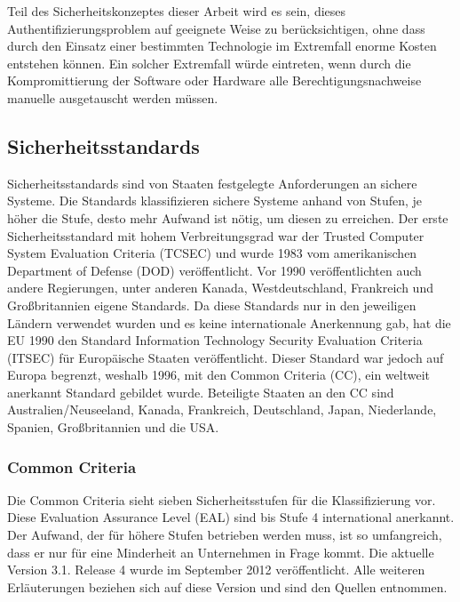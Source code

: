 \documentclass[11pt,a4paper]{report}
\begin{document}
Teil des Sicherheitskonzeptes dieser Arbeit wird es sein, dieses Authentifizierungsproblem auf geeignete Weise zu berücksichtigen, ohne dass durch den Einsatz einer bestimmten Technologie im Extremfall enorme Kosten entstehen können. Ein solcher Extremfall würde eintreten, wenn durch die Kompromittierung der Software oder Hardware alle Berechtigungsnachweise manuelle ausgetauscht werden müssen.

\subsection{Sicherheitsstandards} \label{sec:sec_standard}

Sicherheitsstandards sind von Staaten festgelegte Anforderungen an sichere Systeme. Die Standards klassifizieren sichere Systeme anhand von Stufen, je höher die Stufe, desto mehr Aufwand ist nötig, um diesen zu erreichen. Der erste Sicherheitsstandard mit hohem Verbreitungsgrad war der Trusted Computer System Evaluation Criteria (TCSEC) und wurde 1983 vom amerikanischen Department of Defense (DOD) veröffentlicht. Vor 1990 veröffentlichten auch andere Regierungen, unter anderen Kanada, Westdeutschland, Frankreich und Großbritannien eigene Standards. Da diese Standards nur in den jeweiligen Ländern verwendet wurden und es keine internationale Anerkennung gab, hat die EU 1990 den Standard Information Technology Security Evaluation Criteria (ITSEC) für Europäische Staaten veröffentlicht. Dieser Standard war jedoch auf Europa begrenzt, weshalb 1996, mit den Common Criteria (CC), ein weltweit anerkannt Standard gebildet wurde. Beteiligte Staaten an den CC sind Australien/Neuseeland, Kanada, Frankreich, Deutschland, Japan, Niederlande, Spanien, Großbritannien und die USA.

\subsubsection{Common Criteria}

Die Common Criteria sieht sieben Sicherheitsstufen für die Klassifizierung vor. Diese Evaluation Assurance Level (EAL) sind bis Stufe 4 international anerkannt. Der Aufwand, der für höhere Stufen betrieben werden muss, ist so umfangreich, dass er nur für eine Minderheit an Unternehmen in Frage kommt. Die aktuelle Version 3.1. Release 4 wurde im September 2012 veröffentlicht. Alle weiteren Erläuterungen beziehen sich auf diese Version und sind den Quellen \cite{ccp1, ccp2, ccp3, bsi_ccguide} entnommen.
\end{document}
